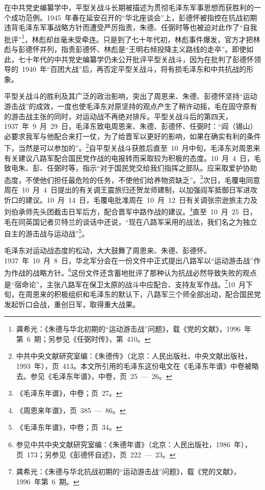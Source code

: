 在中共党史编纂学中，平型关战斗长期被描述为贯彻毛泽东军事思想而获胜利的一个成功范例。1945~年春在延安召开的“华北座谈会”上，彭德怀被指控在抗战初期违背毛泽东军事战略方针而遭受严厉指责，朱德、任弼时等也被迫对此作了“自我批评”\footnote{龚希光：《朱德与华北初期的“运动游击战”问题》，载《党的文献》，1996~年第~6~期；另参见《任弼时传》，第~410。}，林彪却丝毫未受牵连。只是到了七十年代初，林彪事件爆发，官方才把林彪与彭德怀并列，指责彭德怀、林彪是“王明右倾投降主义路线的走卒”。即使如此，七十年代的中共党史编纂学仍未公开批评平型关战斗，因为在批判了彭德怀领导的~1940~年“百团大战”后，再否定平型关战斗，将有损毛泽东和中共抗战的形象。

平型关战斗的胜利及其广泛的政治影响，突出了周恩来、朱德、彭德怀坚持“运动游击战”的成效，一度也使毛泽东对原坚持的观点产生了稍许动摇，毛在固守原有的游击战主张的同时，对运动战不再绝对排斥。平型关战斗后的第四天，1937~年~9~月~29~日，毛泽东致电周恩来、朱德、彭德怀、任弼时：“阎（锡山）必要求我军与他配合来打一仗，为了给晋军以更好的影响，如果在确实有利的条件下，当然是可以参加的”。\footnote{中共中央文献研究室编：《朱德传》（北京：人民出版社、中央文献出版社，1993~年），页~413。本文所引用的毛泽东这份电文在《毛泽东年谱》中卷被略去。参见《毛泽东年谱》，中卷，页~25~—~26。}自平型关战斗获胜后直至~10~月中旬，毛泽东对周恩来有关建议八路军配合国民党作战的电报转而采取较为积极的态度。10~月~4~日，毛致电朱、彭、任弼时等，指示“对于国民党交给我们指挥之部队。应采取爱护协助态度，不使他们担任最危险的任务，不使他们给养物资缺乏”。\footnote{《毛泽东年谱》，中卷；页~27。}次日，毛覆电同意周在~10~月~4~日提出的有关调王震旅归还贺龙师建制，以加强阎军抵御日军进攻忻口的建议。10~月~14~日，毛覆电批准周在~10~月~12~日有关调张宗逊旅主力及刘伯承师先头团截击日军后方，配合晋军中路作战的建议。\footnote{《周恩来年谱》，页~385~—~86。}直至~10~月~25~日，毛在同英国记者贝特兰的谈话中还说，“现在八路军采用的战法，我们名之为独立自主的游击战与运动战”\footnote{《毛泽东年谱》，中卷；页~34。}。

毛泽东对运动战态度的松动，大大鼓舞了周恩来、朱德、彭德怀。1937~年~10~月~8~日，华北军分会在一份文件中正式提出八路军以“运动游击战”作为作战的战略方针。\footnote{参见中共中央文献研究室编：《朱德年谱》（北京：人民出版社，1986~年），页~173；另参见《彭德怀自述》，页~222~—~23。}这份文件还含蓄地批评了那种认为抗战必然导致失败的观点是“宿命论”，主张八路军在保卫太原的战斗中应配合、支持友军作战。\footnote{龚希光：《朱德与华北抗战初期的“运动游击战”问题》，载《党的文献》，1996~年第~6~期。}10~月下旬，在周恩来的积极组织和毛泽东的默认下，八路军三个师全部出动，配合国民党发起忻口会战，重创日军，取得重大战果。

